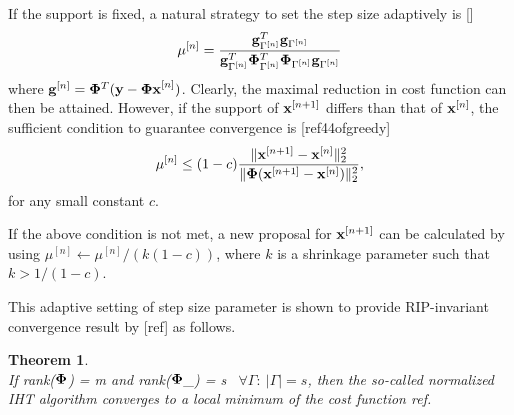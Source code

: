 \documentclass{article}
\newtheorem{theorem}{Theorem}
\begin{document}
If the support is fixed, a natural strategy to set the step size adaptively is []
\begin{equation}
   \mu^{[n]} = \frac{{\bf g}^T_{\Gamma^{[n]}}{\bf g}_{\Gamma^{[n]}}}{{\bf g}^T_{\Gamma^{[n]}}{\bf \Phi}^T_{\Gamma^{[n]}}{\bf \Phi}_{\Gamma^{[n]}}{\bf g}_{\Gamma^{[n]}}}
\end{equation}
where ${\bf g}^{[n]} = {\bf \Phi}^T({\bf y}-{\bf \Phi x}^{[n]})$. Clearly, the maximal reduction in cost function can then be attained. However, if the support of ${\bf x}^{[n+1]}$ differs than that of ${\bf x}^{[n]}$, the sufficient condition to guarantee convergence is [ref44ofgreedy]
\begin{equation}
    \mu^{[n]} \leq(1-c) \frac{\|{\bf x}^{[n+1]}-{\bf x}^{[n]} \|_2^2}{\|{\bf \Phi}({\bf x}^{[n+1]}-{\bf x}^{[n]}) \|_2^2},
\end{equation}
for any small constant $c$.

If the above condition is not met, a new proposal for ${\bf x}^{[n+1]}$ can be calculated by using $\mu^{[n]}\leftarrow{\mu^{[n]}/(k(1-c))}$, where $k$ is a shrinkage parameter such that $k>1/(1-c)$.

This adaptive setting of step size parameter is shown to provide RIP-invariant convergence result by [ref] as follows.
\begin{theorem}
{\rm{\cite{niht}}}\\
If rank({${\bf \Phi}$}) = m and rank(${\bf \Phi}$_{\Gamma}) = s \ $\forall \Gamma:\ |\Gamma| = s$, then the so-called normalized IHT algorithm converges to a local minimum of the cost function ref.
\end{theorem}
\end{document}
